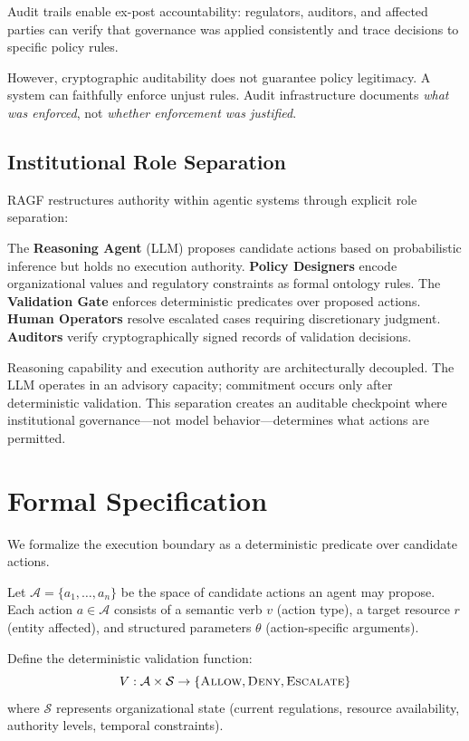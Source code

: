 \documentclass[sigconf,nonacm]{acmart}
\begin{document}
Audit trails enable ex-post accountability: regulators, auditors, and affected parties can verify that governance was applied consistently and trace decisions to specific policy rules.

However, cryptographic auditability does not guarantee policy legitimacy. A system can faithfully enforce unjust rules. Audit infrastructure documents \emph{what was enforced}, not \emph{whether enforcement was justified}.

\subsection{Institutional Role Separation}

RAGF restructures authority within agentic systems through explicit role separation:

The \textbf{Reasoning Agent} (LLM) proposes candidate actions based on probabilistic inference but holds no execution authority. \textbf{Policy Designers} encode organizational values and regulatory constraints as formal ontology rules. The \textbf{Validation Gate} enforces deterministic predicates over proposed actions. \textbf{Human Operators} resolve escalated cases requiring discretionary judgment. \textbf{Auditors} verify cryptographically signed records of validation decisions.

Reasoning capability and execution authority are architecturally decoupled. The LLM operates in an advisory capacity; commitment occurs only after deterministic validation. This separation creates an auditable checkpoint where institutional governance---not model behavior---determines what actions are permitted.

\section{Formal Specification}

We formalize the execution boundary as a deterministic predicate over candidate actions.

Let $\mathcal{A} = \{a_1, \ldots, a_n\}$ be the space of candidate actions an agent may propose. Each action $a \in \mathcal{A}$ consists of a semantic verb $v$ (action type), a target resource $r$ (entity affected), and structured parameters $\theta$ (action-specific arguments).

Define the deterministic validation function:
\begin{equation}
V : \mathcal{A} \times \mathcal{S} \rightarrow \{\textsc{Allow}, \textsc{Deny}, \textsc{Escalate}\}
\end{equation}
where $\mathcal{S}$ represents organizational state (current regulations, resource availability, authority levels, temporal constraints).
\end{document}
